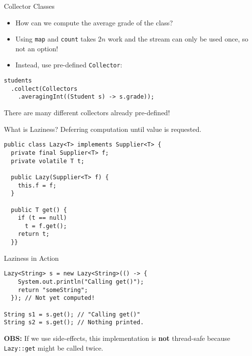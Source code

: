 \documentclass{beamer}
\begin{document}
\begin{frame}[fragile]{Collector Classes}
  \begin{itemize}
  \item How can we compute the average grade of the class?
  \pause{} \item Using \lstinline{map} and \lstinline{count} takes $2n$ work and the stream can only be used once, so not an option!
  \pause{} \item Instead, use pre-defined \lstinline{Collector}:
  \end{itemize}

  \begin{lstlisting}
students
  .collect(Collectors
    .averagingInt((Student s) -> s.grade));
\end{lstlisting}

There are many different collectors already pre-defined!
\end{frame}

\begin{frame}[fragile]{What is Laziness?}
Deferring computation until value is requested.

\begin{lstlisting}
public class Lazy<T> implements Supplier<T> {
  private final Supplier<T> f;
  private volatile T t;

  public Lazy(Supplier<T> f) {
    this.f = f;
  }

  public T get() {
    if (t == null)
      t = f.get();
    return t;
  }}
\end{lstlisting}
\end{frame}

\begin{frame}[fragile]{Laziness in Action}
\begin{lstlisting}
Lazy<String> s = new Lazy<String>(() -> {
    System.out.println("Calling get()");
    return "someString";
  }); // Not yet computed!

String s1 = s.get(); // "Calling get()"
String s2 = s.get(); // Nothing printed.
\end{lstlisting}

\pause{} \vspace{1cm} \textbf{OBS:} If we use side-effects, this implementation is \textbf{not} thread-safe because \lstinline{Lazy::get} might be called twice.

\end{frame}
\end{document}
